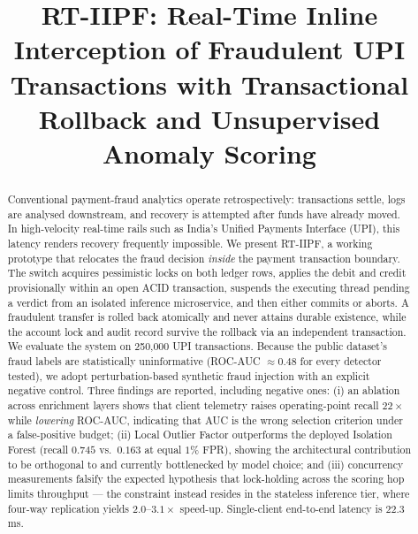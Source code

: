 \documentclass[conference]{IEEEtran}
\newcommand{\todo}[1]{\textcolor{red}{[TODO: #1]}}
\begin{document}
\title{RT-IIPF: Real-Time Inline Interception of Fraudulent UPI Transactions
with Transactional Rollback and Unsupervised Anomaly Scoring}

\author{
\IEEEauthorblockN{\todo{Author One}}
\IEEEauthorblockA{\todo{Department, Institution}\\
\todo{City, India}\\
\todo{email@institution.edu}}
\and
\IEEEauthorblockN{\todo{Author Two}}
\IEEEauthorblockA{\todo{Department, Institution}\\
\todo{City, India}\\
\todo{email@institution.edu}}
}

\maketitle

\begin{abstract}
Conventional payment-fraud analytics operate retrospectively: transactions
settle, logs are analysed downstream, and recovery is attempted after funds
have already moved. In high-velocity real-time rails such as India's Unified
Payments Interface (UPI), this latency renders recovery frequently
impossible. We present RT-IIPF, a working prototype that relocates the fraud
decision \emph{inside} the payment transaction boundary. The switch acquires
pessimistic locks on both ledger rows, applies the debit and credit
provisionally within an open ACID transaction, suspends the executing thread
pending a verdict from an isolated inference microservice, and then either
commits or aborts. A fraudulent transfer is rolled back atomically and never
attains durable existence, while the account lock and audit record survive
the rollback via an independent transaction. We evaluate the system on
250{,}000 UPI transactions. Because the public dataset's fraud labels are
statistically uninformative (ROC-AUC $\approx 0.48$ for every detector
tested), we adopt perturbation-based synthetic fraud injection with an
explicit negative control. Three findings are reported, including negative
ones: (i) an ablation across enrichment layers shows that client telemetry
raises operating-point recall $22\times$ while \emph{lowering} ROC-AUC,
indicating that AUC is the wrong selection criterion under a false-positive
budget; (ii) Local Outlier Factor outperforms the deployed Isolation Forest
(recall $0.745$ vs.\ $0.163$ at equal $1\%$ FPR), showing the architectural
contribution to be orthogonal to and currently bottlenecked by model choice;
and (iii) concurrency measurements falsify the expected hypothesis that
lock-holding across the scoring hop limits throughput --- the constraint
instead resides in the stateless inference tier, where four-way replication
yields $2.0$--$3.1\times$ speed-up. Single-client end-to-end latency is
$22.3$\,ms.
\end{abstract}
\end{document}
